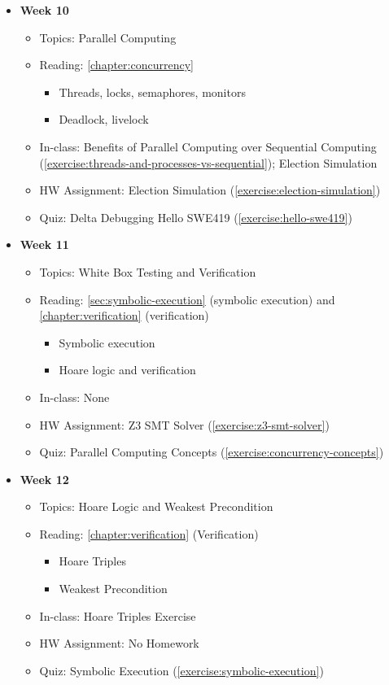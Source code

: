 \documentclass[oneside,11pt,dvipsnames]{book}
\begin{document}
\begin{itemize}
    \item \textbf{Week 10}
    \begin{itemize}
        \item Topics: Parallel Computing
        \item Reading: \autoref{chapter:concurrency}
        \begin{itemize}
            \item Threads, locks, semaphores, monitors
            \item Deadlock, livelock
        \end{itemize}
        \item In-class: Benefits of Parallel Computing over Sequential Computing (\autoref{exercise:threads-and-processes-vs-sequential}); Election Simulation
        \item HW Assignment: Election Simulation (\autoref{exercise:election-simulation})
        \item Quiz: Delta Debugging Hello SWE419 (\autoref{exercise:hello-swe419})
    \end{itemize}

    \item \textbf{Week 11}
    \begin{itemize}
        \item Topics: White Box Testing and Verification
        \item Reading: \autoref{sec:symbolic-execution} (symbolic execution) and \autoref{chapter:verification} (verification)
        \begin{itemize}
            \item Symbolic execution
            \item Hoare logic and verification
        \end{itemize}
        \item In-class: None
        \item HW Assignment: Z3 SMT Solver (\autoref{exercise:z3-smt-solver})
        \item Quiz: Parallel Computing Concepts (\autoref{exercise:concurrency-concepts})
    \end{itemize}

    \item \textbf{Week 12}
    \begin{itemize}
        \item Topics: Hoare Logic and Weakest Precondition
        \item Reading: \autoref{chapter:verification} (Verification)
        \begin{itemize}
            \item Hoare Triples
            \item Weakest Precondition
        \end{itemize}
        \item In-class: Hoare Triples Exercise
        \item HW Assignment: No Homework
        \item Quiz: Symbolic Execution (\autoref{exercise:symbolic-execution})
    \end{itemize}


\end{itemize}
\end{document}
